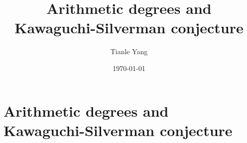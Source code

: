 \documentclass[sectionlevel=section,status=draft]{noteformyself}
\title{Arithmetic degrees and Kawaguchi-Silverman conjecture}
\author{Tianle Yang}
\date{\today}
\begin{document}
    \maketitle

    \section[
      status=draft,
      tag=00000,
      label=\labelNFM{sec:periodic-points-and-orbits:arithmetic-degrees-and-kawaguchi-silverman-conjecture}
    ]{Arithmetic degrees and Kawaguchi-Silverman conjecture}

    

\end{document}
